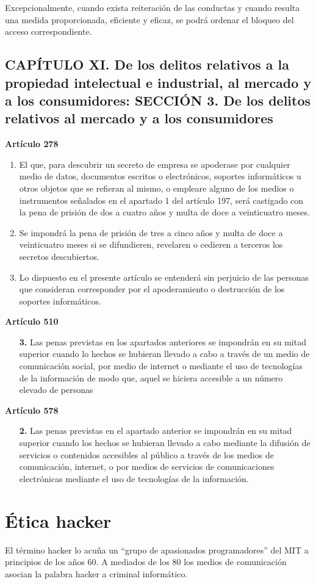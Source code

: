 Excepcionalmente, cuando exista reiteración de las conductas y cuando resulta una medida proporcionada, eficiente y eficaz, se podrá ordenar el bloqueo del acceso correspondiente.


\subsection{CAPÍTULO XI. De los delitos relativos a la propiedad intelectual e industrial, al mercado y a los consumidores: SECCIÓN 3. De los delitos relativos al mercado y a los consumidores}

\textbf{Artículo 278}
\begin{enumerate}[label=\textbf{\arabic*.}]
    \item El que, para descubrir un secreto de empresa se apoderase por cualquier medio de datos, documentos escritos o electrónicos, soportes informáticos u otros objetos que se refieran al mismo, o empleare alguno de los medios o instrumentos señalados en el apartado 1 del artículo 197, será castigado con la pena de prisión de dos a cuatro años y multa de doce a veinticuatro meses.
    \item Se impondrá la pena de prisión de tres a cinco años y multa de doce a veinticuatro meses si se difundieren, revelaren o cedieren a terceros los secretos descubiertos.
    \item Lo dispuesto en el presente artículo se entenderá sin perjuicio de las personas que consideran corresponder por el apoderamiento o destrucción de los soportes informáticos.
\end{enumerate}

\textbf{Artículo 510}
\begin{itemize}
    \item[\textbf{3.}] Las penas previstas en los apartados anteriores se impondrán en su mitad superior cuando lo hechos se hubieran llevado a cabo a través de un medio de comunicación social, por medio  de internet o mediante el uso de tecnologías de la información de modo que, aquel se hiciera accesible a un número elevado de personas
\end{itemize}

\textbf{Artículo 578}
\begin{itemize}
    \item[\textbf{2.}] Las penas previstas en el apartado anterior se impondrán en su mitad superior cuando los hechos se hubieran llevado a cabo mediante la difusión de servicios o contenidos accesibles al público a través de los medios de comunicación, internet, o por medios de servicios de comunicaciones electrónicas mediante el uso de tecnologías de la información.
\end{itemize}


\section{Ética hacker}

El término hacker lo acuña un ``grupo de apasionados programadores'' del MIT a principios de los años 60. A mediados de los 80 los medios de comunicación asocian la palabra hacker a criminal informático. %
